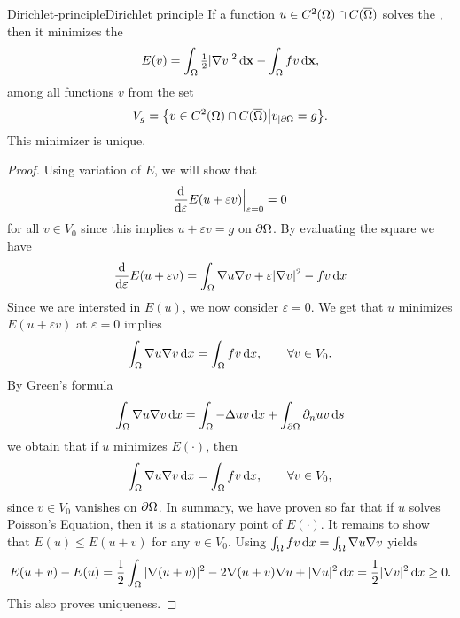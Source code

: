 \begin{Theorem*}{Dirichlet-principle}{Dirichlet principle}
  If a function $u\in C^2(\Omega)\cap C(\overline{\Omega})$ solves
  the , then it minimizes the
  \begin{gather}
    \label{eq:Dirichlet-energy}
    E(v) = \int_{\Omega} \tfrac12 \lvert\nabla v\rvert^2 \,\mathrm{d} \mathbf x - \int_{\Omega} f v \,\mathrm{d} \mathbf x,
  \end{gather}
  among all functions $v$ from the set
  \begin{gather}
    V_g = \bigl\{ v\in C^2(\Omega)\cap C(\overline{\Omega})
    \big| v_{|\partial\Omega} = g \bigr\}.
  \end{gather}
  This minimizer is unique.
\end{Theorem*}

\begin{proof}
  Using variation of $E$, we will show that
  \begin{gather*}
    \frac{\mathrm{d}}{\mathrm{d} \varepsilon} E(u+\varepsilon v)
    \Big|_{\varepsilon=0} = 0
  \end{gather*}
  for all $v \in V_0$ since this implies $u + \varepsilon v = g$
  on $\partial\Omega$. By evaluating the square we have
  \begin{gather*}
    \frac{\mathrm{d}}{\mathrm{d} \varepsilon} E(u+\varepsilon v)
    = \int_\Omega \nabla u \nabla v + \varepsilon \lvert\nabla v\rvert^2 - fv \,\mathrm{d} x
  \end{gather*}
  Since we are intersted in $E(u)$, we now consider $\varepsilon=0$. We
  get that $u$ minimizes $E(u+\varepsilon v)$ at $\varepsilon = 0$ implies
  \begin{gather*}
    \int_\Omega \nabla u \nabla v \,\mathrm{d} x = \int_\Omega fv \,\mathrm{d} x,
    \qquad\forall v\in V_0.
  \end{gather*}
  By Green's formula
  \begin{gather*}
    \int_\Omega \nabla u \nabla v \,\mathrm{d} x = \int_\Omega - \Delta u v \,\mathrm{d} x
    + \int_{\partial\Omega} \partial_n u v \,\mathrm{d} s
  \end{gather*}
  we obtain that if $u$ minimizes $E(\cdot)$, then
  \begin{gather*}
    \int_\Omega \nabla u \nabla v \,\mathrm{d} x = \int_\Omega fv \,\mathrm{d} x,
    \qquad\forall v\in V_0,
  \end{gather*}
  since $v \in V_0$ vanishes on $\partial\Omega$. In summary, we have
  proven so far that if $u$ solves Poisson's Equation, then it is a
  stationary point of $E(\cdot)$. It remains to show that
  $E(u) \le E(u+v)$ for any $v\in V_0$.  Using
  $\int_\Omega fv \,\mathrm{d} x = \int_\Omega \nabla u \nabla v$ yields
  \begin{multline*}
    E(u+v) - E(u) = \frac 12 \int_\Omega |\nabla (u+v)|^2 - 2 \nabla (u+v) \nabla u
    + |\nabla u|^2 \,\mathrm{d} x
    = \frac 12 |\nabla v|^2 \,\mathrm{d} x \ge 0.
  \end{multline*}
  This also proves uniqueness.
\end{proof}

